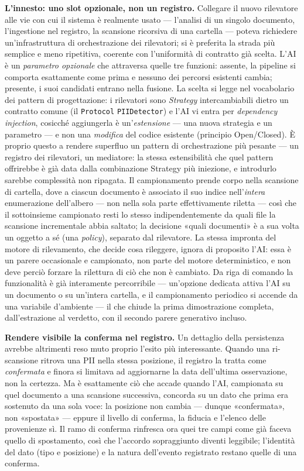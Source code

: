 \textbf{L'innesto: uno slot opzionale, non un registro.} Collegare il nuovo rilevatore alle vie con cui il sistema è realmente usato --- l'analisi di un singolo documento, l'ingestione nel registro, la scansione ricorsiva di una cartella --- poteva richiedere un'infrastruttura di orchestrazione dei rilevatori; si è preferita la strada più semplice e meno ripetitiva, coerente con l'uniformità di contratto già scelta. L'AI è un \emph{parametro opzionale} che attraversa quelle tre funzioni: assente, la pipeline si comporta esattamente come prima e nessuno dei percorsi esistenti cambia; presente, i suoi candidati entrano nella fusione. La scelta si legge nel vocabolario dei pattern di progettazione: i rilevatori sono \emph{Strategy} intercambiabili dietro un contratto comune (il \texttt{Protocol} \texttt{PIIDetector}) e l'AI vi entra per \emph{dependency injection}, cosicché aggiungerla è un'\emph{estensione} --- una nuova strategia e un parametro --- e non una \emph{modifica} del codice esistente (principio Open/Closed). È proprio questo a rendere superfluo un pattern di orchestrazione più pesante --- un registro dei rilevatori, un mediatore: la stessa estensibilità che quel pattern offrirebbe è già data dalla combinazione Strategy più iniezione, e introdurlo sarebbe complessità non ripagata. Il campionamento prende corpo nella scansione di cartella, dove a ciascun documento è associato il suo indice nell'\emph{intera} enumerazione dell'albero --- non nella sola parte effettivamente riletta --- così che il sottoinsieme campionato resti lo stesso indipendentemente da quali file la scansione incrementale abbia saltato; la decisione «quali documenti» è a sua volta un oggetto a sé (una \emph{policy}), separato dal rilevatore. La stessa impronta del motore di rilevamento, che decide cosa rileggere, ignora di proposito l'AI: essa è un parere occasionale e campionato, non parte del motore deterministico, e non deve perciò forzare la rilettura di ciò che non è cambiato. Da riga di comando la funzionalità è già interamente percorribile --- un'opzione dedicata attiva l'AI su un documento o su un'intera cartella, e il campionamento periodico si accende da una variabile d'ambiente --- il che chiude la prima dimostrazione completa, dall'estrazione al verdetto, con il secondo parere generativo incluso. \medskip

\textbf{Rendere visibile la conferma nel registro.} Un dettaglio della persistenza avrebbe altrimenti reso muto proprio l'esito più interessante. Quando una ri-scansione ritrova una PII nella stessa posizione, il registro la tratta come \emph{confermata} e finora si limitava ad aggiornarne la data dell'ultima osservazione, non la certezza. Ma è esattamente ciò che accade quando l'AI, campionata su quel documento a una scansione successiva, concorda su un dato che prima era sostenuto da una sola voce: la posizione non cambia --- dunque «confermata», non «spostata» --- eppure il livello di conferma, la fiducia e l'elenco delle provenienze sì. Il ramo di conferma rinfresca ora quei tre campi come già faceva quello di spostamento, così che l'accordo sopraggiunto diventi leggibile; l'identità del dato (tipo e posizione) e la natura dell'evento registrato restano quelle di una conferma. \medskip

